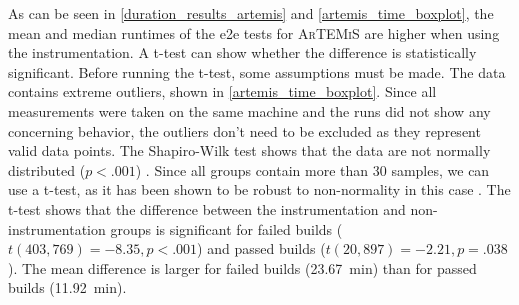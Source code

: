 As can be seen in \cref{duration_results_artemis} and \cref{artemis_time_boxplot}, the mean and median runtimes of the \acs{e2e} tests for \textsc{ArTEMiS} are higher when using the instrumentation.
A t-test can show whether the difference is statistically significant.
Before running the t-test, some assumptions must be made.
The data contains extreme outliers, shown in \cref{artemis_time_boxplot}.
Since all measurements were taken on the same machine and the runs did not show any concerning behavior, the outliers don't need to be excluded as they represent valid data points.
The Shapiro-Wilk test shows that the data are not normally distributed ($p < .001$) \autocite{shapiro_analysis_1965}.
Since all groups contain more than 30 samples, we can use a t-test, as it has been shown to be robust to non-normality in this case \autocite{wilcox_introduction_2011}.
The t-test shows that the difference between the instrumentation and non-instrumentation groups is significant for failed builds ($t(403,769) = -8.35, p < .001$) and passed builds ($t(20,897) = -2.21, p = .038$).
The mean difference is larger for failed builds (\SI{23.67}{\minute}) than for passed builds (\SI{11.92}{\minute}).

